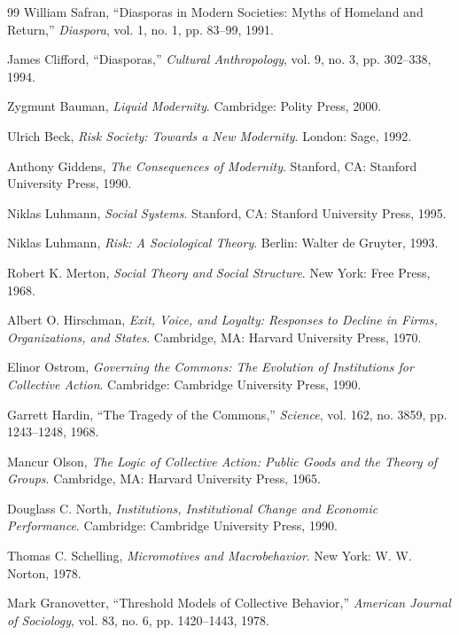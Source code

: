 \documentclass[11pt,oneside]{book}
\theoremstyle{definition}
\theoremstyle{remark}
\begin{document}
\begin{thebibliography}{99}
 William Safran, ``Diasporas in Modern Societies: Myths of Homeland and Return,''
  \emph{Diaspora}, vol. 1, no. 1, pp. 83--99, 1991.

 James Clifford, ``Diasporas,'' \emph{Cultural Anthropology}, vol. 9, no. 3, pp. 302--338, 1994.

 Zygmunt Bauman, \emph{Liquid Modernity}. Cambridge: Polity Press, 2000.

 Ulrich Beck, \emph{Risk Society: Towards a New Modernity}. London: Sage, 1992.

 Anthony Giddens, \emph{The Consequences of Modernity}. Stanford, CA: Stanford University Press,
  1990.

 Niklas Luhmann, \emph{Social Systems}. Stanford, CA: Stanford University Press, 1995.

 Niklas Luhmann, \emph{Risk: A Sociological Theory}. Berlin: Walter de Gruyter, 1993.

 Robert K. Merton, \emph{Social Theory and Social Structure}. New York: Free Press, 1968.

 Albert O. Hirschman, \emph{Exit, Voice, and Loyalty: Responses to Decline in Firms,
  Organizations, and States}. Cambridge, MA: Harvard University Press, 1970.

 Elinor Ostrom, \emph{Governing the Commons: The Evolution of Institutions for Collective
  Action}. Cambridge: Cambridge University Press, 1990.

 Garrett Hardin, ``The Tragedy of the Commons,'' \emph{Science}, vol. 162, no. 3859, pp.
  1243--1248, 1968.

 Mancur Olson, \emph{The Logic of Collective Action: Public Goods and the Theory of Groups}.
  Cambridge, MA: Harvard University Press, 1965.

 Douglass C. North, \emph{Institutions, Institutional Change and Economic Performance}.
  Cambridge: Cambridge University Press, 1990.

 Thomas C. Schelling, \emph{Micromotives and Macrobehavior}. New York: W. W. Norton, 1978.

 Mark Granovetter, ``Threshold Models of Collective Behavior,'' \emph{American Journal of
  Sociology}, vol. 83, no. 6, pp. 1420--1443, 1978.


\end{thebibliography}
\end{document}
